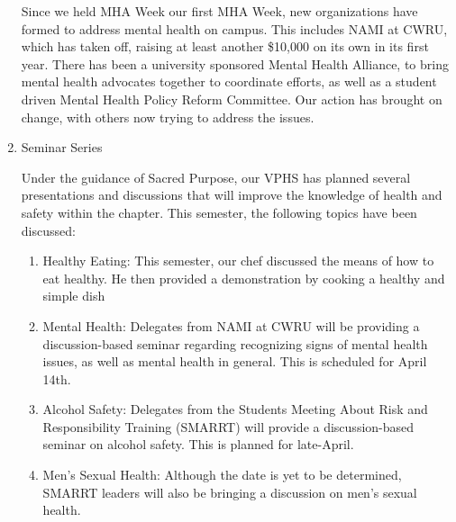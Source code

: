 \begin{enumerate}
  	Since we held MHA Week our first MHA Week, new organizations have formed to address mental health on campus. This includes NAMI at CWRU, which has taken off, raising at least another \$10,000 on its own in its first year. There has been a university sponsored Mental Health Alliance, to bring mental health advocates together to coordinate efforts, as well as a student driven Mental Health Policy Reform Committee. Our action has brought on change, with others now trying to address the issues.
  	
    \item Seminar Series
    
	  Under the guidance of Sacred Purpose, our VPHS has planned several presentations and discussions that will improve the knowledge of health and safety within the chapter. This semester, the following topics have been discussed:	
	  \begin{enumerate}
	    \item Healthy Eating: This semester, our chef discussed the means of how to eat healthy. He then provided a demonstration by cooking a healthy and simple dish
	    \item Mental Health: Delegates from NAMI at CWRU will be providing a discussion-based seminar regarding recognizing signs of mental health issues, as well as mental health in general. This is scheduled for April 14th.
	    \item Alcohol Safety: Delegates from the Students Meeting About Risk and Responsibility Training (SMARRT) will provide a discussion-based seminar on alcohol safety. This is planned for late-April.
	    \item Men's Sexual Health: Although the date is yet to be determined, SMARRT leaders will also be bringing a discussion on men's sexual health.
	\end{enumerate}
 \end{enumerate}